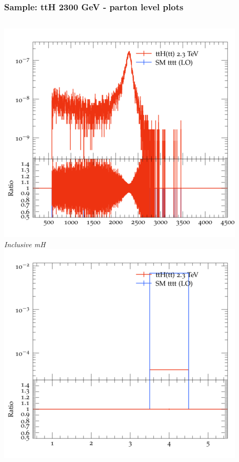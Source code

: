 \documentclass{beamer}
\begin{document}
\begin{frame}
\frametitle{Sample: ttH 2300 GeV - parton level plots}
\begin{columns}
\includegraphics[width=\textwidth]{../plots/ttH_2300/tttt_ttH/Inclusive_mH.png}\\
\textit{\small Inclusive mH}
\includegraphics[width=\textwidth]{../plots/ttH_2300/tttt_ttH/Inclusive_nTop.png}\\

\end{columns}
\end{frame}
\end{document}

